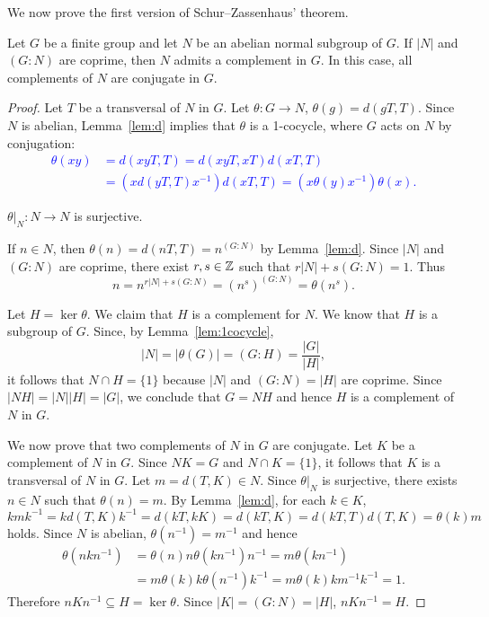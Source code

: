 We now prove the first version of Schur--Zassenhaus' theorem. 

\begin{theorem}
	\label{thm:SchurZassenhaus:abelian}
	Let $G$ be a finite group and let $N$ be an abelian normal subgroup of $G$. If 
	$|N|$ and $(G:N)$ are coprime, then $N$ admits a complement in $G$. In this case, all complements
	of $N$ are conjugate in $G$.  
\end{theorem}

\begin{proof}
	Let $T$ be a transversal of $N$ in $G$. Let $\theta\colon G\to N$,
	$\theta(g)=d(gT,T)$. Since $N$ is abelian, Lemma~\ref{lem:d} implies that 
	$\theta$ is a 1-cocycle, where $G$ acts on $N$ by conjugation: 
	\textcolor{blue}{
	\begin{align*}
		\theta(xy)&=d(xyT,T)
		=d(xyT,xT)d(xT,T)\\
		&=(xd(yT,T)x^{-1})d(xT,T)=(x \theta(y)x^{-1})\theta(x).
	\end{align*}}

	\begin{claim}
		$\theta|_N\colon N\to N$ is surjective.
	\end{claim}

	If $n\in N$, then  
	$\theta(n)=d(nT,T)=n^{(G:N)}$ by Lemma~\ref{lem:d}. Since $|N|$ and $(G:N)$ are coprime, 
	there exist $r,s\in\mathbb{Z}$ such that $r|N|+s(G:N)=1$. Thus
	\[
		n=n^{r|N|+s(G:N)}=(n^s)^{(G:N)}=\theta(n^s).
	\]

	Let $H=\ker\theta$. We claim that $H$ is a complement for $N$. 
	We know that $H$ is a subgroup of $G$. Since, by Lemma~\ref{lem:1cocycle},  
	\[
		|N|=|\theta(G)|=(G:H)=\frac{|G|}{|H|},
	\]
	 it follows that $N\cap H=\{1\}$ because 
	$|N|$ and $(G:N)=|H|$ are coprime. Since $|NH|=|N||H|=|G|$, we conclude that 
	$G=NH$ and hence $H$ is a complement of $N$ in $G$.

	We now prove that two complements of $N$ in $G$ are conjugate. Let  
	$K$ be a complement of $N$ in $G$. Since $NK=G$ and $N\cap K=\{1\}$, it follows that 
	$K$ is a transversal of $N$ in $G$. Let $m=d(T,K)\in N$. Since $\theta|_N$ is surjective, 
	there exists $n\in N$ such that $\theta(n)=m$. By 
	Lemma~\ref{lem:d}, for each $k\in K$, 
	\[
	kmk^{-1}=kd(T,K)k^{-1}=d(kT,kK)=d(kT,K)=d(kT,T)d(T,K)=\theta(k)m
	\]
	holds. Since $N$ is abelian,
	$\theta(n^{-1})=m^{-1}$ and hence  
	\begin{align*}
		\theta(nkn^{-1})&=\theta(n)n\theta(kn^{-1})n^{-1}
		=m\theta(kn^{-1})\\
		&=m\theta(k)k\theta(n^{-1})k^{-1}
		=m\theta(k)km^{-1}k^{-1}=1.
	\end{align*}
	Therefore $nKn^{-1}\subseteq H=\ker\theta$. Since
	$|K|=(G:N)=|H|$, $nKn^{-1}=H$.
\end{proof}


